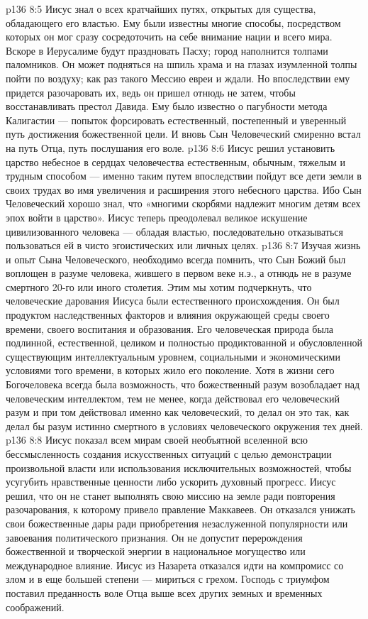 \vs p136 8:5 Иисус знал о всех кратчайших путях, открытых для существа, обладающего его властью. Ему были известны многие способы, посредством которых он мог сразу сосредоточить на себе внимание нации и всего мира. Вскоре в Иерусалиме будут праздновать Пасху; город наполнится толпами паломников. Он может подняться на шпиль храма и на глазах изумленной толпы пойти по воздуху; как раз такого Мессию евреи и ждали. Но впоследствии ему придется разочаровать их, ведь он пришел отнюдь не затем, чтобы восстанавливать престол Давида. Ему было известно о пагубности метода Калигастии --- попыток форсировать естественный, постепенный и уверенный путь достижения божественной цели. И вновь Сын Человеческий смиренно встал на путь Отца, путь послушания его воле.
\vs p136 8:6 Иисус решил установить царство небесное в сердцах человечества естественным, обычным, тяжелым и трудным способом --- именно таким путем впоследствии пойдут все дети земли в своих трудах во имя увеличения и расширения этого небесного царства. Ибо Сын Человеческий хорошо знал, что «многими скорбями надлежит многим детям всех эпох войти в царство». Иисус теперь преодолевал великое искушение цивилизованного человека --- обладая властью, последовательно отказываться пользоваться ей в чисто эгоистических или личных целях.
\vs p136 8:7 \pc Изучая жизнь и опыт Сына Человеческого, необходимо всегда помнить, что Сын Божий был воплощен в разуме человека, жившего в первом веке н.э., а отнюдь не в разуме смертного 20\hyp{}го или иного столетия. Этим мы хотим подчеркнуть, что человеческие дарования Иисуса были естественного происхождения. Он был продуктом наследственных факторов и влияния окружающей среды своего времени, своего воспитания и образования. Его человеческая природа была подлинной, естественной, целиком и полностью продиктованной и обусловленной существующим интеллектуальным уровнем, социальными и экономическими условиями того времени, в которых жило его поколение. Хотя в жизни сего Богочеловека всегда была возможность, что божественный разум возобладает над человеческим интеллектом, тем не менее, когда действовал его человеческий разум и при том действовал именно как человеческий, то делал он это так, как делал бы разум истинно смертного в условиях человеческого окружения тех дней.
\vs p136 8:8 \pc Иисус показал всем мирам своей необъятной вселенной всю бессмысленность создания искусственных ситуаций с целью демонстрации произвольной власти или использования исключительных возможностей, чтобы усугубить нравственные ценности либо ускорить духовный прогресс. Иисус решил, что он не станет выполнять свою миссию на земле ради повторения разочарования, к которому привело правление Маккавеев. Он отказался унижать свои божественные дары ради приобретения незаслуженной популярности или завоевания политического признания. Он не допустит перерождения божественной и творческой энергии в национальное могущество или международное влияние. Иисус из Назарета отказался идти на компромисс со злом и в еще большей степени --- мириться с грехом. Господь с триумфом поставил преданность воле Отца выше всех других земных и временных соображений.

